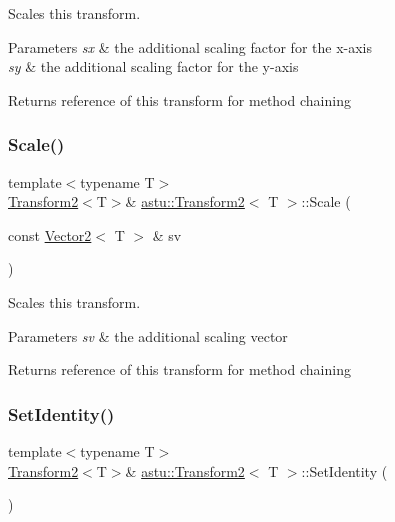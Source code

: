 Scales this transform.


\begin{DoxyParams}{Parameters}
{\em sx} & the additional scaling factor for the x-\/axis \\
\hline
{\em sy} & the additional scaling factor for the y-\/axis \\
\hline
\end{DoxyParams}
\begin{DoxyReturn}{Returns}
reference of this transform for method chaining 
\end{DoxyReturn}
\mbox{\label{classastu_1_1Transform2_a776970c69186667e1dad8a8815f29703}} 
\subsubsection{\texorpdfstring{Scale()}{Scale()}\hspace{0.1cm}{\footnotesize\ttfamily [2/2]}}
{\footnotesize\ttfamily template$<$typename T$>$ \\
\hyperlink{classastu_1_1Transform2}{Transform2}$<$T$>$\& \hyperlink{classastu_1_1Transform2}{astu\+::\+Transform2}$<$ T $>$\+::Scale (\begin{DoxyParamCaption}\item[{const \hyperlink{classastu_1_1Vector2}{Vector2}$<$ T $>$ \&}]{sv }\end{DoxyParamCaption})\hspace{0.3cm}{\ttfamily [inline]}}

Scales this transform.


\begin{DoxyParams}{Parameters}
{\em sv} & the additional scaling vector \\
\hline
\end{DoxyParams}
\begin{DoxyReturn}{Returns}
reference of this transform for method chaining 
\end{DoxyReturn}
\mbox{\label{classastu_1_1Transform2_ad1bb8dd413003a605456b022f43a3dad}} 
\subsubsection{\texorpdfstring{Set\+Identity()}{SetIdentity()}}
{\footnotesize\ttfamily template$<$typename T$>$ \\
\hyperlink{classastu_1_1Transform2}{Transform2}$<$T$>$\& \hyperlink{classastu_1_1Transform2}{astu\+::\+Transform2}$<$ T $>$\+::Set\+Identity (\begin{DoxyParamCaption}{ }\end{DoxyParamCaption})\hspace{0.3cm}{\ttfamily [inline]}}

